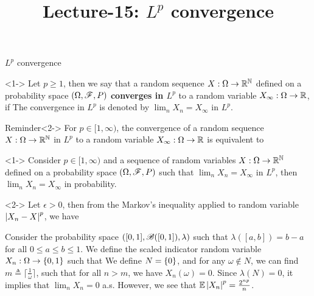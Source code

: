 \documentclass[12pt,aspectratio=169]{beamer}
\title{Lecture-15: $L^p$ convergence}%
\date{}
\begin{document}
\pagestyle{empty}
\maketitle

\begin{frame}{$L^p$ convergence}
\begin{Definition}[Convergence in $L^p$]<1->
Let $p \ge 1$, 
then we say that a random sequence $X: \Omega \to \mathbb{R}^{\mathbb{N}}$ defined on a probability space $(\Omega,\mathscr{F},P)$ \textbf{converges in $L^p$} to a random variable $X_\infty:\Omega \to \mathbb{R}$, 
if 
The convergence in $L^p$ is denoted by $\lim_nX_n = X_\infty$ in $L^p$. 
\end{Definition}
\begin{block}{Reminder}<2->
For $p \in [1, \infty)$, the convergence of a random sequence $X: \Omega\to\mathbb{R}^{\mathbb{N}}$ in $L^p$  to a random variable $X_\infty:\Omega \to \mathbb{R}$ is equivalent to 
\end{block}
\end{frame}

\begin{frame}
\begin{prop}<1-> 
Consider $p \in [1, \infty)$ and a sequence of random variables $X:\Omega\to\mathbb{R}^{\mathbb{N}}$ defined on a probability space $(\Omega,\mathscr{F}, P)$ such that $\lim_nX_n = X_\infty$ in $L^p$, then $\lim_nX_n = X_\infty$ in probability.
\end{prop}
\begin{Proof}<2->
Let $\epsilon > 0$, then from the Markov's inequality applied to random variable $\left\lvert X_n-X\right\rvert^p$, we have
\end{Proof}
\end{frame}

\begin{frame}
\begin{Example} 
Consider the probability space $([0,1], \mathscr{B}([0,1]), \lambda)$ such that $\lambda([a,b]) = b-a$ for all $0 \le a \le b \le 1$. 
We define the scaled indicator random variable $X_n: \Omega \to \left\{0,1\right\}$ such that
We define $N = \left\{0\right\}$, 
and for any $\omega \notin N$, we can find $m \triangleq \lceil \frac{1}{\omega}\rceil$, 
such that for all $n > m$, we have $X_n(\omega) = 0$. 
Since $\lambda(N) = 0$, it implies that $\lim_nX_n = 0$ a.s. 
However, we see that $\mathbb{E}\left\lvert X_n\right\rvert^p = \frac{2^{np}}{n}$. 
\end{Example}
\end{frame}
\end{document}
